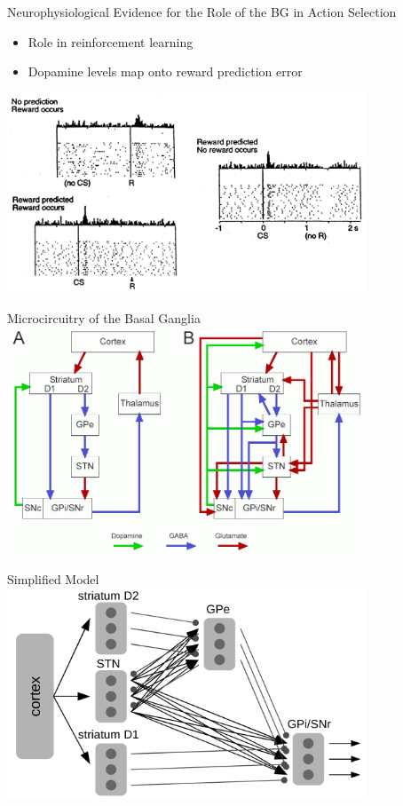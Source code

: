 \documentclass[handout,aspectratio=169]{beamer}
\begin{document}
	\begin{frame}{Neurophysiological Evidence for the Role of the BG in Action Selection}
		\begin{multicols}{2}
		\begin{itemize}
			\setlength{\itemsep}{0.25cm}
			\item Role in reinforcement learning
			\item Dopamine levels map onto reward prediction error
		\end{itemize}
		\end{multicols}
		\centering
		\includegraphics[width=0.8\textwidth]{media/dopamine.png}
	\end{frame}

	\begin{frame}{Microcircuitry of the Basal Ganglia}
		\centering
		\includegraphics[width=0.8\textwidth]{media/basal_ganglia2.png}
	\end{frame}

	\begin{frame}{Simplified Model}
		\centering
		\includegraphics[width=0.8\textwidth]{media/gpr3.png}
	\end{frame}
\end{document}
